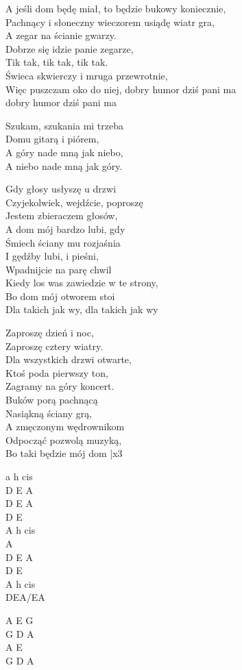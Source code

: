 
\begin{text}
    A jeśli dom będę miał, to będzie bukowy koniecznie,\\
    Pachnący i słoneczny wieczorem usiądę wiatr gra,\\
    A zegar na ścianie gwarzy.\\
    Dobrze się idzie panie zegarze,\\
    Tik tak, tik tak, tik tak.\\
    Świeca skwierczy i mruga przewrotnie,\\
    Więc puszczam oko do niej, dobry humor dziś pani ma\\
    dobry humor dziś pani ma

    \vin Szukam, szukania mi trzeba\\
    \vin Domu gitarą i piórem,\\
    \vin A góry nade mną jak niebo,\\
    \vin A niebo nade mną jak góry.

    Gdy głosy usłyszę u drzwi\\
    Czyjekolwiek, wejdźcie, poproszę\\
    Jestem zbieraczem głosów,\\
    A dom mój bardzo lubi, gdy\\
    Śmiech ściany mu rozjaśnia\\
    I gędźby lubi, i pieśni,\\
    Wpadnijcie na parę chwil\\
    Kiedy los was zawiedzie w te strony,\\
    Bo dom mój otworem stoi\\
    Dla takich jak wy, dla takich jak wy

    Zaproszę dzień i noc,\\
    Zaproszę cztery wiatry.\\
    Dla wszystkich drzwi otwarte,\\
    Ktoś poda pierwszy ton,\\
    Zagramy na góry koncert.\\
    Buków porą pachnącą\\
    Nasiąkną ściany grą,\\
    A zmęczonym wędrownikom\\
    Odpocząć pozwolą muzyką,\\
    Bo taki będzie mój dom |x3
\end{text}
\begin{chord}
    a h cis\\
    D E A\\
    D E A\\
    D E\\
    A h cis\\
    A\\
    D E A\\
    D E\\
    A h cis\\
    DEA/EA

    A E G\\
    G D A\\
    A E\\
    G D A
\end{chord}